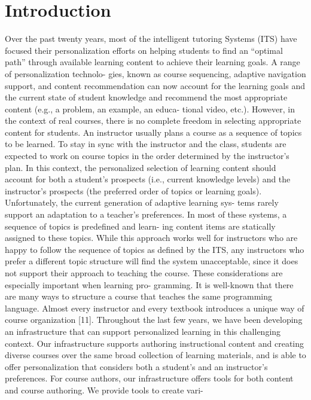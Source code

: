 \documentclass{sig-alternate}
\begin{document}
\section{Introduction}
Over the past twenty years, most of the intelligent tutoring Systems
(ITS) have focused their personalization efforts on helping students
to find an “optimal path” through available learning content to
achieve their learning goals. A range of personalization technolo-
gies, known as course sequencing, adaptive navigation support,
and content recommendation can now account for the learning
goals and the current state of student knowledge and recommend
the most appropriate content (e.g., a problem, an example, an educa-
tional video, etc.). However, in the context of real courses, there is
no complete freedom in selecting appropriate content for students.
An instructor usually plans a course as a sequence of topics to be learned. To stay in sync with the instructor and the class, students
are expected to work on course topics in the order determined by
the instructor’s plan. In this context, the personalized selection
of learning content should account for both a student’s prospects
(i.e., current knowledge levels) and the instructor’s prospects (the
preferred order of topics or learning goals).
Unfortunately, the current generation of adaptive learning sys-
tems rarely support an adaptation to a teacher’s preferences. In
most of these systems, a sequence of topics is predefined and learn-
ing content items are statically assigned to these topics. While
this approach works well for instructors who are happy to follow
the sequence of topics as defined by the ITS, any instructors who
prefer a different topic structure will find the system unacceptable,
since it does not support their approach to teaching the course.
These considerations are especially important when learning pro-
gramming. It is well-known that there are many ways to structure
a course that teaches the same programming language. Almost
every instructor and every textbook introduces a unique way of
course organization [11]. Throughout the last few years, we have
been developing an infrastructure that can support personalized
learning in this challenging context. Our infrastructure supports
authoring instructional content and creating diverse courses over
the same broad collection of learning materials, and is able to offer
personalization that considers both a student’s and an instructor’s
preferences. For course authors, our infrastructure offers tools for
both content and course authoring. We provide tools to create vari-
\end{document}
